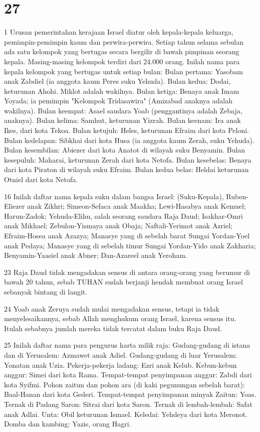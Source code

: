 \chapter{27}

\par 1 Urusan pemerintahan kerajaan Israel diatur oleh kepala-kepala keluarga, pemimpin-pemimpin kaum dan perwira-perwira. Setiap tahun selama sebulan ada satu kelompok yang bertugas secara bergilir di bawah pimpinan seorang kepala. Masing-masing kelompok terdiri dari 24.000 orang. Inilah nama para kepala kelompok yang bertugas untuk setiap bulan: Bulan pertama: Yasobam anak Zabdiel (ia anggota kaum Peres suku Yehuda). Bulan kedua: Dodai, keturunan Ahohi. Miklot adalah wakilnya. Bulan ketiga: Benaya anak Imam Yoyada; ia pemimpin "Kelompok Tridasawira" (Amizabad anaknya adalah wakilnya). Bulan keempat: Asael saudara Yoab (penggantinya adalah Zebaja, anaknya). Bulan kelima: Samhut, keturunan Yizrah. Bulan keenam: Ira anak Ikes, dari kota Tekoa. Bulan ketujuh: Heles, keturunan Efraim dari kota Peloni. Bulan kedelapan: Sibkhai dari kota Husa (ia anggota kaum Zerah, suku Yehuda). Bulan kesembilan: Abiezer dari kota Anatot di wilayah suku Benyamin. Bulan kesepuluh: Maharai, keturunan Zerah dari kota Netofa. Bulan kesebelas: Benaya dari kota Piraton di wilayah suku Efraim. Bulan kedua belas: Heldai keturunan Otniel dari kota Netofa.
\par 16 Inilah daftar nama kepala suku dalam bangsa Israel: (Suku-Kepala), Ruben-Eliezer anak Zikhri; Simeon-Sefaca anak Maakha; Lewi-Hasabya anak Kemuel; Harun-Zadok; Yehuda-Elihu, salah seorang saudara Raja Daud; Isakhar-Omri anak Mikhael; Zebulon-Yismaya anak Obaja; Naftali-Yerimot anak Azriel; Efraim-Hosea anak Azazya; Manasye yang di sebelah barat Sungai Yordan-Yoel anak Pedaya; Manasye yang di sebelah timur Sungai Yordan-Yido anak Zakharia; Benyamin-Yaasiel anak Abner; Dan-Azareel anak Yeroham.
\par 23 Raja Daud tidak mengadakan sensus di antara orang-orang yang berumur di bawah 20 tahun, sebab TUHAN sudah berjanji hendak membuat orang Israel sebanyak bintang di langit.
\par 24 Yoab anak Zeruya sudah mulai mengadakan sensus, tetapi ia tidak menyelesaikannya, sebab Allah menghukum orang Israel, karena sensus itu. Itulah sebabnya jumlah mereka tidak tercatat dalam buku Raja Daud.
\par 25 Inilah daftar nama para pengurus harta milik raja: Gudang-gudang di istana dan di Yerusalem: Azmawet anak Adiel. Gudang-gudang di luar Yerusalem: Yonatan anak Uzia. Pekerja-pekerja ladang: Ezri anak Kelub. Kebun-kebun anggur: Simei dari kota Rama. Tempat-tempat penyimpanan anggur: Zabdi dari kota Syifmi. Pohon zaitun dan pohon ara (di kaki pegunungan sebelah barat): Baal-Hanan dari kota Gederi. Tempat-tempat penyimpanan minyak Zaitun: Yoas. Ternak di Padang Saron: Sitrai dari kota Saron. Ternak di lembah-lembah: Safat anak Adlai. Unta: Obil keturunan Ismael. Keledai: Yehdeya dari kota Meronot. Domba dan kambing: Yazis, orang Hagri.
